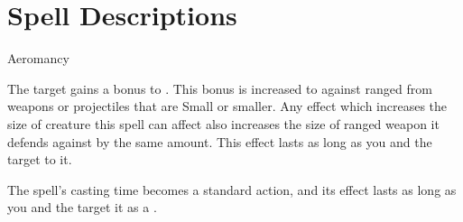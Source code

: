 \section{Spell Descriptions}
\begin{spellsection}{Aeromancy}
\begin{spellheader}
\end{spellheader}
\begin{spellcontent}
\begin{spelltargetinginfo}
\end{spelltargetinginfo}
\begin{spelleffects}
\spelleffect
The target gains a  bonus to .
This bonus is increased to  against ranged  from weapons or projectiles that are Small or smaller.
Any effect which increases the size of creature this spell can affect also increases the size of ranged weapon it defends against by the same amount.
This effect lasts as long as you and the target  to it.
\end{spelleffects}
\end{spellcontent}
\begin{spellfooter}
\end{spellfooter}
\begin{spellsubcontent}
\begin{spellcantrip}
The spell's casting time becomes a standard action, and its effect lasts as long as you and the target  it as a .
\end{spellcantrip}
\end{spellsubcontent}
\end{spellsection}
